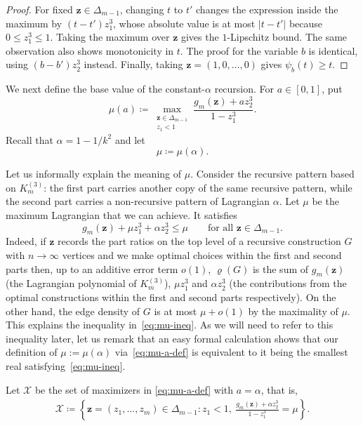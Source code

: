 \documentclass[10pt]{article}
\numberwithin{equation}{section}
\begin{document}
\begin{proof}
For fixed $\mathbf{z}\in\Delta_{m-1}$, changing $t$ to $t'$ changes the expression inside the maximum by $(t-t')z_1^3$, whose absolute value is at most $|t-t'|$ because $0\le z_1^3\le 1$. Taking the maximum over $\mathbf{z}$ gives the $1$-Lipschitz bound. The same observation also shows monotonicity in $t$. The proof for the variable $b$ is identical, using $(b-b')z_2^3$ instead. Finally, taking $\mathbf{z}=(1,0,\ldots,0)$ gives $\psi_b(t)\ge t$.
\end{proof}

We next define the base value of the constant-$\alpha$ recursion. For $a\in[0,1]$, put
\begin{equation}
        \mu(a)\coloneqq
        \max_{\substack{\mathbf{z}\in\Delta_{m-1}\\ z_1<1}}
        \frac{g_m(\mathbf{z})+az_2^3}{1-z_1^3}.
        \label{eq:mu-a-def}
\end{equation}
Recall that $\alpha=1-1/k^2$ and let 
\[
        \mu\coloneqq \mu(\alpha).
\]

Let us informally explain the meaning of $\mu$. Consider the recursive pattern based on $K_m^{(3)}$: the first part carries another copy of the same recursive pattern, while the second part carries a non-recursive pattern of Lagrangian $\alpha$. Let $\mu$ be the maximum Lagrangian that we can achieve. It satisfies
\begin{equation}
        g_m(\mathbf{z})+\mu z_1^3+\alpha z_2^3\le \mu \qquad\text{for all } \mathbf{z}\in\Delta_{m-1}.
        \label{eq:mu-ineq}
\end{equation}
Indeed, if $\mathbf{z}$ records the part ratios on the top level of a recursive construction $G$ with $n\to\infty$ vertices and we make optimal choices within the first and second parts then, up to an additive error term $o(1)$,  $\varrho(G)$ is the sum of $g_m(\mathbf{z})$ (the Lagrangian polynomial of $K_m^{(3)}$), $\mu z_1^3$ and $\alpha z_2^3$ (the contributions from the optimal constructions within the first and second parts respectively). On the other hand, the edge density of $G$ is at most $\mu+o(1)$ by the maximality of $\mu$. This explains the inequality in~\eqref{eq:mu-ineq}.  As we will need to refer to this inequality later, let us remark that an easy formal calculation shows that our definition of $\mu:=\mu(\alpha)$ via~\eqref{eq:mu-a-def} is equivalent to it being the smallest real satisfying~\eqref{eq:mu-ineq}.



Let $\mathcal X$ be the set of maximizers in \eqref{eq:mu-a-def} with $a=\alpha$, that is, 
\begin{align*}
    \mathcal X
    \coloneqq 
    \left\{\mathbf{z} = (z_1, \ldots, z_m) \in \Delta_{m-1} \colon z_1 < 1,\ \frac{g_m(\mathbf{z}) + \alpha z_2^3}{1-z_1^3} = \mu \right\}. 
\end{align*}
\end{document}
